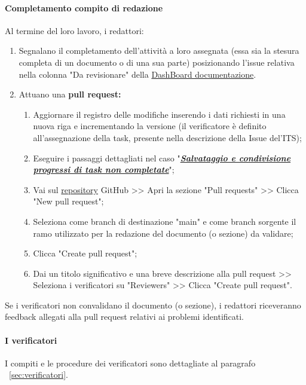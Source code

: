\vspace{0.3cm}

\paragraph*{\textbf{Completamento compito di redazione}}
Al termine del loro lavoro, i redattori:
\begin{enumerate}
    \item Segnalano il completamento dell'attività a loro assegnata (essa sia la stesura completa di un documento o di una sua parte) posizionando l'issue relativa nella colonna "Da revisionare" della \href{https://github.com/orgs/ByteOps-swe/projects/1/views/1}{DashBoard documentazione}.
    \item Attuano una \textbf{pull request:}
          \begin{enumerate}
              \item Aggiornare il registro delle modifiche inserendo i dati richiesti in  una nuova riga e incrementando la versione (il verificatore è definito all'assegnazione della task, presente nella descrizione della Issue del'ITS);
              \item Eseguire i passaggi dettagliati nel caso "\hyperlink{par:salvataggioecondivisioneprogressitasknoncompletate}{\textit{\textbf{Salvataggio e condivisione progressi di task non completate}}}";
              \item Vai sul \href{https://github.com/ByteOps-swe/Sorgente-documenti.git}{repository} GitHub >> Apri la sezione "Pull requests" >> Clicca "New pull request";
              \item Seleziona come branch di destinazione "main" e come branch sorgente il ramo utilizzato per la redazione del documento (o sezione) da validare;
              \item Clicca "Create pull request";
              \item Dai un titolo significativo e una breve descrizione alla pull request >> Seleziona i verificatori su "Reviewers" >> Clicca "Create pull request".
          \end{enumerate}
\end{enumerate}

Se i verificatori non convalidano il documento (o sezione), i redattori riceveranno feedback allegati alla pull request relativi ai problemi identificati.

\paragraph{I verificatori}
I compiti e le procedure dei verificatori sono dettagliate al paragrafo ~\ref{sec:verificatori}.

